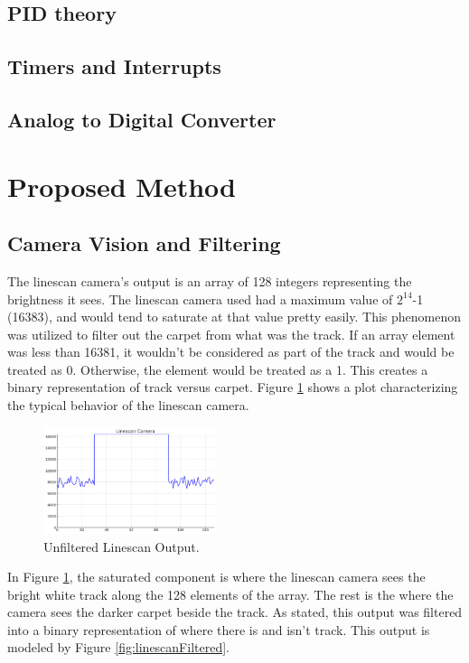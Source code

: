 \documentclass[conference]{IEEEtran}
\begin{document}
\subsection{PID theory}

\subsection{Timers and Interrupts}

\subsection{Analog to Digital Converter}

\section{Proposed Method}

\subsection{Camera Vision and Filtering}

The linescan camera's output is an array of 128 integers representing the brightness it sees. The linescan camera used had a maximum value of $2^{14}$-1 (16383), and would tend to saturate at that value pretty easily. This phenomenon was utilized to filter out the carpet from what was the track. If an array element was less than 16381, it wouldn't be considered as part of the track and would be treated as 0. Otherwise, the element would be treated as a 1. This creates a binary representation of track versus carpet. Figure \ref{fig:linescan} shows a plot characterizing the typical behavior of the linescan camera.

\begin{figure}[htbp]
	\centerline{\includegraphics[width=0.45\textwidth]{images/linescan.png}}
	\caption{Unfiltered Linescan Output.}
	\label{fig:linescan}
\end{figure}

In Figure \ref{fig:linescan}, the saturated component is where the linescan camera sees the bright white track along the 128 elements of the array. The rest is the where the camera sees the darker carpet beside the track. As stated, this output was filtered into a binary representation of where there is and isn't track. This output is modeled by Figure \ref{fig:linescanFiltered}.
\end{document}
